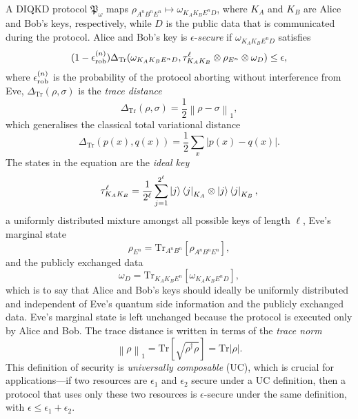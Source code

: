 \documentclass[10pt, a4paper]{article}
\numberwithin{equation}{section} %
\theoremstyle{definition}
\theoremstyle{plain}
\newcommand{\norm}[1]{\left\lVert#1\right\rVert}
\newcommand{\abs}[1]{\left\lvert#1\right\rvert}
\newcommand{\?}{\mathrel{?}} %
\newcommand{\Tr}{\mathrm{Tr}} %
\newcommand{\rob}{\rm rob}
\newcommand{\erob}[1]{\epsilon_{\rob}^{(#1)}}
\begin{document}
    A DIQKD protocol \(\mathfrak{P}_{\omega}\) maps \(\rho_{A^n B^n E^n} \mapsto \omega_{K_A K_B E^n D}\), where \(K_A\) and \(K_B\) are Alice and Bob's keys, respectively, while \(D\) is the public data that is communicated during the protocol. Alice and Bob's key is \(\epsilon\)-\emph{secure} if \(\omega_{K_A K_B E^n D}\) satisfies~\cite{SecurityQKD}
    \begin{equation}
      (1-\erob{n})\Delta_{\Tr}(\omega_{K_A K_B E^n D}, \tau_{K_A K_B}^{\ell} \otimes \rho_{E^n} \otimes \omega_D) \leq \epsilon,
    \end{equation}
    where \(\erob{n}\) is the probability of the protocol aborting without interference from Eve, \(\Delta_{\Tr}(\rho,\sigma)\) is the \emph{trace distance}
    \begin{equation}
      \Delta_{\Tr}(\rho, \sigma) = \frac{1}{2}\norm{\rho - \sigma}_1,
    \end{equation}
    which generalises the classical total variational distance
    \[ \Delta_{\Tr}(p(x),q(x)) = \frac{1}{2} \sum_{x} \abs{p(x)-q(x)}. \]
    The states in the equation are the \emph{ideal key}
    \begin{equation}
      \tau_{K_A K_B}^{\ell} = \frac{1}{2^{\ell}} \sum_{j=1}^{2^{\ell}} \ket{j}\bra{j}_{K_A} \otimes \ket{j}\bra{j}_{K_B},
    \end{equation}
    a uniformly distributed mixture amongst all possible keys of length \(\ell\), Eve's marginal state
    \begin{equation}
      \rho_{E^n} = \Tr_{A^n B^n}\left[ \rho_{A^n B^n E^n} \right],
    \end{equation}
    and the publicly exchanged data
    \begin{equation}
      \omega_D = \Tr_{K_A K_B E^n}\left[ \omega_{K_A K_B E^n D} \right],
    \end{equation} 
    which is to say that Alice and Bob's keys should ideally be uniformly distributed and independent of Eve's quantum side information and the publicly exchanged data. Eve's marginal state is left unchanged because the protocol is executed only by Alice and Bob. The trace distance is written in terms of the \emph{trace norm}
    \begin{equation}
      \norm{\rho}_1 = \Tr\left[ \sqrt{\rho^{\dagger}\rho} \right] = \Tr\abs{\rho}.
    \end{equation}
    This definition of security is \emph{universally composable} (UC), which is crucial for applications---if two resources are \(\epsilon_1\) and \(\epsilon_2\) secure under a UC definition, then a protocol that uses only these two resources is \(\epsilon\)-secure under the same definition, with \(\epsilon \leq \epsilon_1 + \epsilon_2\).
\end{document}
